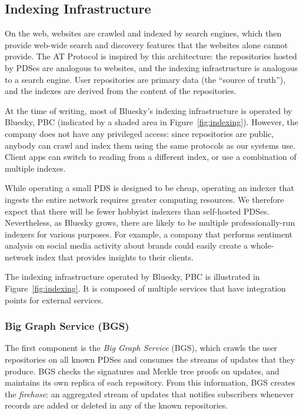 \documentclass[sigconf,review]{acmart}
\begin{document}
\subsection{Indexing Infrastructure}\label{sec:indexing}

On the web, websites are crawled and indexed by search engines, which then provide web-wide search and discovery features that the websites alone cannot provide.
The AT Protocol is inspired by this architecture: the repositories hosted by PDSes are analogous to websites, and the indexing infrastructure is analogous to a search engine.
User repositories are primary data (the ``source of truth''), and the indexes are derived from the content of the repositories.

At the time of writing, most of Bluesky's indexing infrastructure is operated by Bluesky, PBC (indicated by a shaded area in Figure~\ref{fig:indexing}).
However, the company does not have any privileged access: since repositories are public, anybody can crawl and index them using the same protocols as our systems use.
Client apps can switch to reading from a different index, or use a combination of multiple indexes.

While operating a small PDS is designed to be cheap, operating an indexer that ingests the entire network requires greater computing resources.
We therefore expect that there will be fewer hobbyist indexers than self-hosted PDSes.
Nevertheless, as Bluesky grows, there are likely to be multiple professionally-run indexers for various purposes.
For example, a company that performs sentiment analysis on social media activity about brands could easily create a whole-network index that provides insights to their clients.

The indexing infrastructure operated by Bluesky, PBC is illustrated in Figure~\ref{fig:indexing}.
It is composed of multiple services that have integration points for external services.

\subsubsection{Big Graph Service (BGS)}\label{sec:bgs}

The first component is the \emph{Big Graph Service} (BGS), which crawls the user repositories on all known PDSes and consumes the streams of updates that they produce.
BGS checks the signatures and Merkle tree proofs on updates, and maintains its own replica of each repository.
From this information, BGS creates the \emph{firehose}: an aggregated stream of updates that notifies subscribers whenever records are added or deleted in any of the known repositories.
\end{document}
